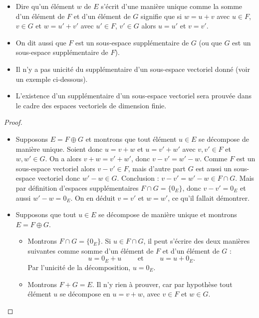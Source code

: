 \documentclass[class=report,crop=false]{standalone}
\begin{document}
\begin{remarque*}
\sauteligne
\begin{itemize}
  \item Dire qu'un élément $w$ de $E$ s'écrit d'une manière unique comme la somme d'un élément de $F$ et d'un élément de $G$
  signifie que si $w=u+v$ avec $u\in F$, $v\in G$ et $w=u'+v'$ avec $u'\in F$, $v'\in G$
alors $u=u'$ et $v=v'$.
  \item On dit aussi que $F$ est un sous-espace supplémentaire de $G$
(ou que $G$ est un sous-espace supplémentaire de $F$).
  \item Il n'y a pas unicité du supplémentaire
  d'un sous-espace vectoriel donné (voir un exemple ci-dessous).
  \item L'existence d'un supplémentaire d'un sous-espace vectoriel
  sera prouvée dans le cadre des espaces vectoriels de dimension finie.
\end{itemize}
\end{remarque*}

\begin{proof}
~
\begin{itemize}
  \item Supposons $E = F \oplus G$ et montrons que tout élément $u\in E$ se décompose de manière unique.
  Soient donc $u=v+w$  et $u=v'+w'$ avec  $v,v' \in F$ et $w,w' \in G$.
On a alors $v+w=v'+w'$, donc $v-v'= w'-w$.
Comme $F$ est un sous-espace vectoriel alors $v-v' \in F$,
mais d'autre part $G$ est aussi un sous-espace vectoriel donc $w'-w\in G$.
Conclusion : $v-v'= w'-w \in F \cap G$. Mais par définition d'espaces supplémentaires
$F \cap G = \{ 0_E \}$, donc $v-v'=0_E$  et aussi $w'-w=0_E$.
On en déduit $v=v'$ et $w=w'$, ce qu'il fallait démontrer.

  \item Supposons que tout $u\in E$ se décompose de manière unique et montrons $E = F \oplus G$.
  \begin{itemize}
    \item Montrons $F\cap G = \{0_E\}$.
    Si $u \in F \cap G$, il peut s'écrire des deux manières suivantes
comme somme d'un élément de $F$ et d'un élément de $G$ :
$$u=0_E+u \qquad \text{ et } \qquad u=u+0_E.$$
Par l'unicité de la décomposition, $u=0_E$.

    \item Montrons $F+G=E$. Il n'y rien à prouver, car par hypothèse tout élément
    $u$ se décompose en $u=v+w$, avec $v \in F$ et $w \in G$.
  \end{itemize}
\end{itemize}
\end{proof}
\end{document}

